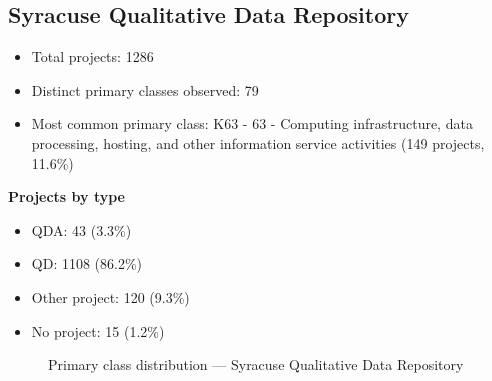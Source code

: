 \subsection{Syracuse Qualitative Data Repository}

\begin{itemize}
    \item Total projects: 1286
    \item Distinct primary classes observed: 79
    \item Most common primary class: K63 - 63 - Computing infrastructure, data processing, hosting, and other information service activities (149 projects, 11.6\%)
\end{itemize}
\textbf{Projects by type}
\begin{itemize}
    \item QDA: 43 (3.3\%)
    \item QD: 1108 (86.2\%)
    \item Other project: 120 (9.3\%)
    \item No project: 15 (1.2\%)
\end{itemize}

\begin{figure}[H]
    \centering
    
    \caption{Primary class distribution --- Syracuse Qualitative Data Repository}
\end{figure}

